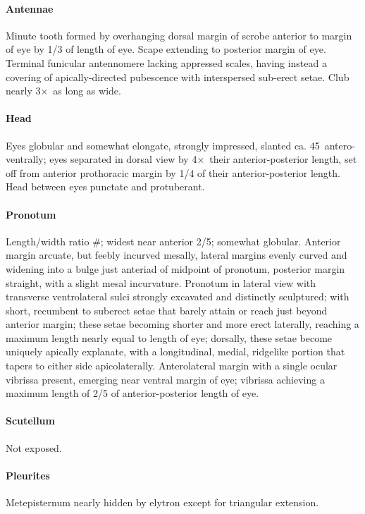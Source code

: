\documentclass[fleqn,10pt,lineno]{wlpeerj} %
\newcommand{\td}{\textdegree~}
\newcommand{\x}{$\times$~}
\begin{document}
			\paragraph{Antennae}
				Minute tooth formed by overhanging dorsal margin of scrobe anterior to margin of eye by 1/3 of length of eye.
				Scape extending to posterior margin of eye.
				Terminal funicular antennomere lacking appressed scales, having instead a covering of apically-directed pubescence with interspersed sub-erect setae.
				Club nearly 3\x as long as wide.
			\paragraph{Head}
				Eyes globular and somewhat elongate, strongly impressed, slanted ca. 45\td antero-ventrally; eyes separated in dorsal view by 4\x their anterior-posterior length, set off from anterior prothoracic margin by 1/4 of their anterior-posterior length. 
				Head between eyes punctate and protuberant.
			\paragraph{Pronotum}
				Length/width ratio \#; widest near anterior 2/5; somewhat globular. 
				Anterior margin arcuate, but feebly incurved mesally, lateral margins evenly curved and widening into a bulge just anteriad of midpoint of pronotum, posterior margin straight, with a slight mesal incurvature. 
				Pronotum in lateral view with transverse ventrolateral sulci strongly excavated and distinctly sculptured; with short, recumbent to suberect setae that barely attain or reach just beyond anterior margin; these setae becoming shorter and more erect laterally, reaching a maximum length nearly equal to length of eye; dorsally, these setae become uniquely apically explanate, with a longitudinal, medial, ridgelike portion that tapers to either side apicolaterally.
				Anterolateral margin with a single ocular vibrissa present, emerging near ventral margin of eye; vibrissa achieving a maximum length of 2/5 of anterior-posterior length of eye.
			\paragraph{Scutellum}
				Not exposed.
			\paragraph{Pleurites}
				Metepisternum nearly hidden by elytron except for triangular extension.
\end{document}
